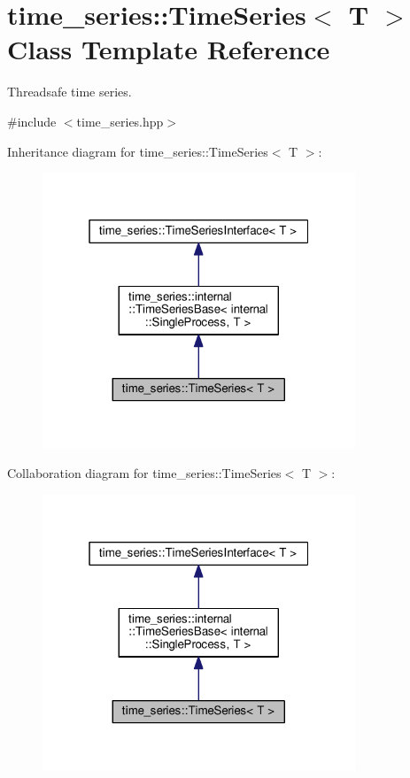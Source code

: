 \hypertarget{classtime__series_1_1TimeSeries}{}\section{time\+\_\+series\+:\+:Time\+Series$<$ T $>$ Class Template Reference}
\label{classtime__series_1_1TimeSeries}


Threadsafe time series.  




{\ttfamily \#include $<$time\+\_\+series.\+hpp$>$}



Inheritance diagram for time\+\_\+series\+:\+:Time\+Series$<$ T $>$\+:
\nopagebreak
\begin{figure}[H]
\begin{center}
\leavevmode
\includegraphics[width=265pt]{classtime__series_1_1TimeSeries__inherit__graph}
\end{center}
\end{figure}


Collaboration diagram for time\+\_\+series\+:\+:Time\+Series$<$ T $>$\+:
\nopagebreak
\begin{figure}[H]
\begin{center}
\leavevmode
\includegraphics[width=265pt]{classtime__series_1_1TimeSeries__coll__graph}
\end{center}
\end{figure}
